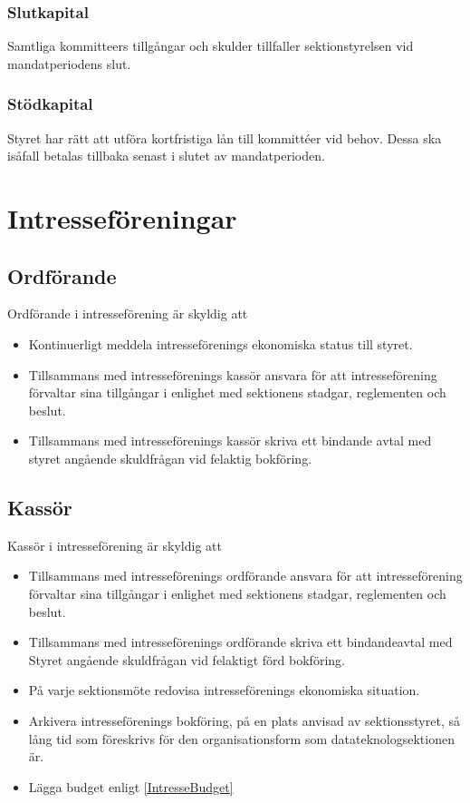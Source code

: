 \documentclass[a4paper]{dtek}
\begin{document}
\subsubsection{Slutkapital}
Samtliga kommitteers tillgångar och skulder tillfaller sektionstyrelsen vid mandatperiodens slut.
\subsubsection{Stödkapital}
Styret har rätt att utföra kortfristiga lån till kommittéer vid behov. Dessa ska isåfall betalas tillbaka senast i slutet av mandatperioden.

\section{Intresseföreningar}
\subsection{Ordförande}
Ordförande i intresseförening är skyldig att
\begin{itemize}
  \item Kontinuerligt meddela intresseförenings ekonomiska status till styret.
  \item Tillsammans med intresseförenings kassör ansvara för att intresseförening förvaltar sina tillgångar i enlighet med sektionens stadgar, reglementen och beslut.
  \item Tillsammans med intresseförenings kassör skriva ett bindande avtal med styret angående skuldfrågan vid felaktig bokföring.
\end{itemize}

\subsection{Kassör}\label{IntresseKassör}
Kassör i intresseförening är skyldig att
\begin{itemize}
  \item Tillsammans med intresseförenings ordförande ansvara för att intresseförening förvaltar sina tillgångar i enlighet med sektionens stadgar, reglementen och beslut.
  \item Tillsammans med intresseförenings ordförande skriva ett bindandeavtal med Styret angående skuldfrågan vid felaktigt förd bokföring.
  \item På varje sektionsmöte redovisa intresseförenings ekonomiska situation.
  \item Arkivera intresseförenings bokföring, på en plats anvisad av sektionsstyret, så lång tid som föreskrivs för den organisationsform som datateknologsektionen är.
  \item Lägga budget enligt \ref{IntresseBudget}
\end{itemize}
\end{document}

